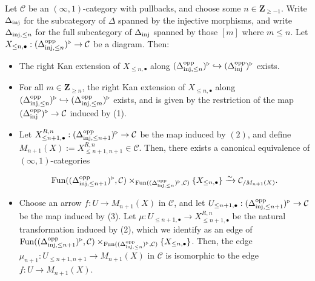 \documentclass[10pt]{article}
\newcommand{\C}{\mathcal C}
\newcommand{\ZZ}{\mathbb{Z}}
\def\ZZ{{\mathbf Z}}
\theoremstyle{witharg}
\theoremstyle{witharg}
\theoremstyle{witharg2}
\begin{document}
\begin{lemma}{}\label{Constructing Semisimplicial Objects}


    Let $\C$ be an $(\infty,1)$-category with pullbacks, and choose some $n\in \ZZ_{\geq -1}$. Write $\Delta_{\textnormal{inj}}$ for the subcategory of $\Delta$ spanned by the injective morphisms, and write $\Delta_{\textnormal{inj},\leq n}$ for the full subcategory of $\Delta_{\textnormal{inj}}$ spanned by those $[m]$ where $m\leq n$. Let $X_{\leq n,\bullet}:(\Delta^{\textnormal{opp}}_{\textnormal{inj},\leq n})^\triangleright\rightarrow \C$ be a diagram. Then: 

    \begin{itemize}
    
        \item [$(1)$] The right Kan extension of $X_{\leq n,\bullet}$ along $(\Delta^{\textnormal{opp}}_{\textnormal{inj},\leq n})^\triangleright\hookrightarrow (\Delta^{\textnormal{opp}}_{\textnormal{inj}})^\triangleright$ exists. 

        \item [$(2)$] For all $m\in \ZZ_{\geq n}$, the right Kan extension of $X_{\leq n,\bullet}$ along $(\Delta^{\textnormal{opp}}_{\textnormal{inj},\leq n})^\triangleright\hookrightarrow (\Delta^{\textnormal{opp}}_{\textnormal{inj},\leq m})^\triangleright$ exists, and is given by the restriction of the map $(\Delta^{\textnormal{opp}}_{\textnormal{inj}})^\triangleright\rightarrow \C$ induced by (1).

        \item [$(3)$] Let $X^{R,n}_{\leq n+1,\bullet}:(\Delta^{\textnormal{opp}}_{\textnormal{inj},\leq n+1})^\triangleright\rightarrow \C$ be the map induced by $(2)$, and define $M_{n+1}(X):=X^{R,n}_{\leq n+1,n+1}\in \C$. Then, there exists a canonical equivalence of $(\infty,1)$-categories 

        $$\textnormal{Fun}((\Delta^{\textnormal{opp}}_{\textnormal{inj},\leq n+1})^\triangleright,\C)\times_{\textnormal{Fun}((\Delta^{\textnormal{opp}}_{\textnormal{inj},\leq n})^\triangleright,\C)}\{X_{\leq n,\bullet}\}\xrightarrow{\sim}\C_{/M_{n+1}(X)}.$$


        \item [$(4)$] Choose an arrow $f:U\rightarrow M_{n+1}(X)$ in $\C$, and let $U_{\leq n+1,\bullet}:(\Delta^{\textnormal{opp}}_{\textnormal{inj},\leq n+1})^\triangleright\rightarrow \C$ be the map induced by (3). Let $\mu:U_{\leq n+1,\bullet}\rightarrow X^{R,n}_{\leq n+1,\bullet}$ be the natural transformation induced by (2), which we identify as an edge of $\textnormal{Fun}((\Delta^{\textnormal{opp}}_{\textnormal{inj},\leq n+1})^\triangleright,\C)\times_{\textnormal{Fun}((\Delta^{\textnormal{opp}}_{\textnormal{inj},\leq n})^\triangleright,\C)}\{X_{\leq n,\bullet}\}$. Then, the edge $\mu_{n+1}:U_{\leq n+1,n+1}\rightarrow M_{n+1}(X)$ in $\C$ is isomorphic to the edge $f:U\rightarrow M_{n+1}(X)$. 

    \end{itemize}

    
\end{lemma}
\end{document}
